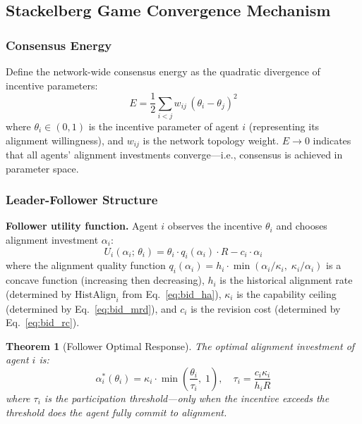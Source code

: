 \documentclass[12pt,a4paper]{article}
\newtheorem{theorem}{Theorem}[section]
\begin{document}
\subsection{Stackelberg Game Convergence Mechanism}\label{sec:stackelberg}

\subsubsection{Consensus Energy}

Define the network-wide consensus energy as the quadratic divergence of incentive parameters:
\begin{equation}\label{eq:energy}
E = \frac{1}{2} \sum_{i<j} w_{ij}\,(\theta_i - \theta_j)^2
\end{equation}
where $\theta_i \in (0,1)$ is the incentive parameter of agent $i$ (representing its alignment willingness), and $w_{ij}$ is the network topology weight. $E \to 0$ indicates that all agents' alignment investments converge---i.e., consensus is achieved in parameter space.

\subsubsection{Leader-Follower Structure}

\textbf{Follower utility function.} Agent $i$ observes the incentive $\theta_i$ and chooses alignment investment $\alpha_i$:
\begin{equation}
U_i(\alpha_i;\, \theta_i) = \theta_i \cdot q_i(\alpha_i) \cdot R - c_i \cdot \alpha_i
\end{equation}
where the alignment quality function $q_i(\alpha_i) = h_i \cdot \min(\alpha_i / \kappa_i,\; \kappa_i / \alpha_i)$ is a concave function (increasing then decreasing), $h_i$ is the historical alignment rate (determined by $\text{HistAlign}_i$ from Eq.~\eqref{eq:bid_ha}), $\kappa_i$ is the capability ceiling (determined by Eq.~\eqref{eq:bid_mrd}), and $c_i$ is the revision cost (determined by Eq.~\eqref{eq:bid_rc}).

\begin{theorem}[Follower Optimal Response]\label{thm:follower}
The optimal alignment investment of agent $i$ is:
\begin{equation}
\alpha_i^*(\theta_i) = \kappa_i \cdot \min\!\left(\frac{\theta_i}{\tau_i},\; 1\right), \quad \tau_i = \frac{c_i \kappa_i}{h_i R}
\end{equation}
where $\tau_i$ is the participation threshold---only when the incentive exceeds the threshold does the agent fully commit to alignment.
\end{theorem}
\end{document}
